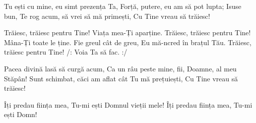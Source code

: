 \beginverse
Tu ești cu mine, eu simt prezența Ta,
Forță, putere, eu am să pot lupta;
Isuse bun, Te rog acum, să vrei să mă primești,
Cu Tine vreau să trăiesc!
\endverse

\beginchorus
Trăiesc, trăiesc pentru Tine!
Viața mea-Ți aparține.
Trăiesc, trăiesc pentru Tine!
Mâna-Ți toate le ține.
Fie greul cât de greu,
Eu mă-ncred în brațul Tău.
Trăiesc, trăiesc pentru Tine!
/: Voia Ta să fac. :/
\endchorus

\beginverse
Pacea divină lasă să curgă acum,
Ca un râu peste mine, fii, Doamne, al meu Stăpân!
Sunt schimbat, căci am aflat cât Tu mă prețuiești,
Cu Tine vreau să trăiesc!
\endverse

\beginverse*
Îți predau ființa mea,
Tu-mi ești Domnul vieții mele!
Îți predau ființa mea,
Tu-mi ești Domn!
\endverse
\endsong